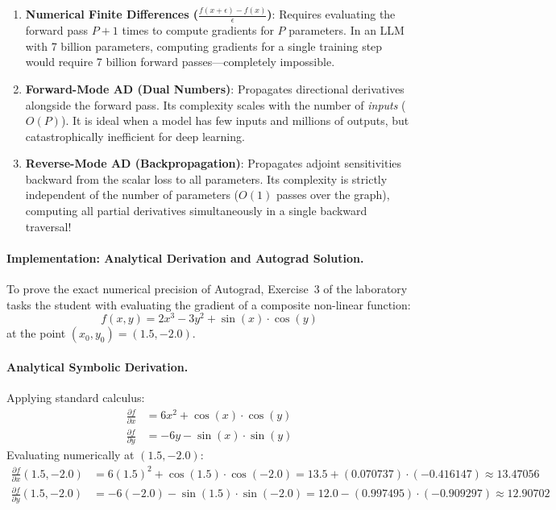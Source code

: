 \documentclass[11pt,a4paper]{article}
\begin{document}
\begin{enumerate}
    \item \textbf{Numerical Finite Differences ($\frac{f(x+\epsilon) - f(x)}{\epsilon}$)}: Requires evaluating the forward pass $P+1$ times to compute gradients for $P$ parameters. In an LLM with 7 billion parameters, computing gradients for a single training step would require 7 billion forward passes---completely impossible.
    \item \textbf{Forward-Mode AD (Dual Numbers)}: Propagates directional derivatives alongside the forward pass. Its complexity scales with the number of \textit{inputs} ($O(P)$). It is ideal when a model has few inputs and millions of outputs, but catastrophically inefficient for deep learning.
    \item \textbf{Reverse-Mode AD (Backpropagation)}: Propagates adjoint sensitivities backward from the scalar loss to all parameters. Its complexity is strictly independent of the number of parameters ($O(1)$ passes over the graph), computing all partial derivatives simultaneously in a single backward traversal!
\end{enumerate}

\paragraph{Implementation: Analytical Derivation and Autograd Solution.}
To prove the exact numerical precision of Autograd, Exercise~3 of the laboratory tasks the student with evaluating the gradient of a composite non-linear function:
\begin{equation}
    f(x, y) = 2x^3 - 3y^2 + \sin(x) \cdot \cos(y)
    \label{eq:composite_function}
\end{equation}
at the point $(x_0, y_0) = (1.5, -2.0)$.

\paragraph{Analytical Symbolic Derivation.}
Applying standard calculus:
\begin{align}
    \frac{\partial f}{\partial x} &= 6x^2 + \cos(x) \cdot \cos(y) \\
    \frac{\partial f}{\partial y} &= -6y - \sin(x) \cdot \sin(y)
\end{align}
Evaluating numerically at $(1.5, -2.0)$:
\begin{align}
    \frac{\partial f}{\partial x}(1.5, -2.0) &= 6(1.5)^2 + \cos(1.5) \cdot \cos(-2.0) = 13.5 + (0.070737) \cdot (-0.416147) \approx 13.47056 \\
    \frac{\partial f}{\partial y}(1.5, -2.0) &= -6(-2.0) - \sin(1.5) \cdot \sin(-2.0) = 12.0 - (0.997495) \cdot (-0.909297) \approx 12.90702
\end{align}
\end{document}

